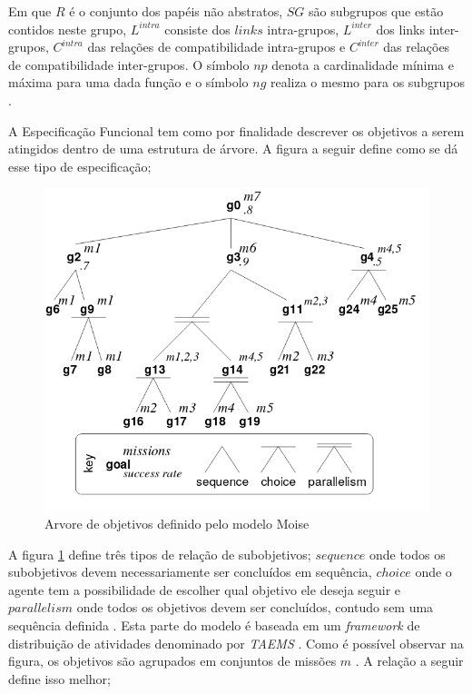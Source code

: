 Em que $R$ é o conjunto dos papéis não abstratos, $SG$ são subgrupos que estão contidos neste grupo, $L^{intra}$ consiste dos $links$ intra-grupos, $L^{inter}$ dos links inter-grupos, 
$C^{intra}$ das relações de compatibilidade intra-grupos e $C^{inter}$ das relações de compatibilidade inter-grupos. O símbolo $np$ denota a cardinalidade mínima e máxima para uma dada 
função e o símbolo $ng$ realiza o mesmo para os subgrupos \cite{moiseframework}. 

A Especificação Funcional tem como por finalidade descrever os objetivos a serem atingidos dentro de uma estrutura de árvore. A figura a seguir define como se dá esse tipo de especificação; 

\begin{figure}[H]
  \centering
  \includegraphics[width=0.8\linewidth]{figure/figmoise} 
  \caption{Arvore de objetivos definido pelo modelo Moise \cite{moiseframework}}
  \label{arvoremoise}
\end{figure}

A figura \ref{arvoremoise} define três tipos de relação de subobjetivos; $sequence$ onde todos os subobjetivos devem necessariamente ser concluídos em sequência, $choice$ onde o agente tem a 
possibilidade de escolher qual objetivo ele deseja seguir e $parallelism$ onde todos os objetivos devem ser concluídos, contudo sem uma sequência definida \cite{taems01} \cite{taems02}. Esta
parte do modelo é baseada em um \textit{framework} de distribuição de atividades denominado por \textit{TAEMS} \cite{TAEMS}.
Como é possível observar na figura, os objetivos são agrupados em conjuntos de missões $m$ \cite{dynamicagenttemporalstruct}. A relação a seguir define isso melhor;

